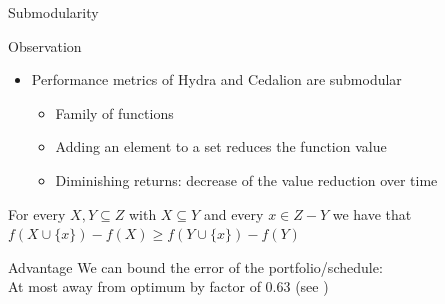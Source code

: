\begin{frame}[c]{Submodularity}

\begin{block}{Observation}
\begin{itemize}
\item Performance metrics of Hydra{} and Cedalion{} are submodular
\begin{itemize}
\item Family of functions
\item Adding an element to a set reduces the function value
\item Diminishing returns: decrease of the value reduction over time
\end{itemize}
\end{itemize}
\end{block}

\pause

\begin{definition}[Submodularity of $f$]
For every $X,Y \subseteq Z$ with $X \subseteq Y$ and every $x \in Z - Y$ we have that $f(X \cup \{x\}) - f(X) \geq f(Y \cup \{x\}) - f(Y)$
\end{definition}

\pause

\begin{block}{Advantage}
We can bound the error of the portfolio/schedule:\\ 
At most away from optimum by factor of $0.63$ (see )
\end{block}

\end{frame}
